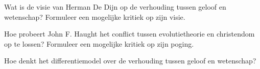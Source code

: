 \documentclass[main.tex]{subfiles}
\begin{document}
\begin{examenvraag}
    \begin{vraag}
        Wat is de visie van Herman De Dijn op de verhouding tussen geloof en wetenschap? Formuleer een mogelijke kritiek op zijn visie.
    \end{vraag}

    \begin{antwoord}
    \end{antwoord}
\end{examenvraag}


\begin{examenvraag}
    \begin{vraag}
        Hoe probeert John F. Haught het conflict tussen evolutietheorie en christendom op te lossen? Formuleer een mogelijke kritiek op zijn poging.
    \end{vraag}

    \begin{antwoord}
    \end{antwoord}
\end{examenvraag}


\begin{examenvraag}
    \begin{vraag}
        Hoe denkt het differentiemodel over de verhouding tussen geloof en wetenschap?
    \end{vraag}

    \begin{antwoord}
    \end{antwoord}
\end{examenvraag}
\end{document}
